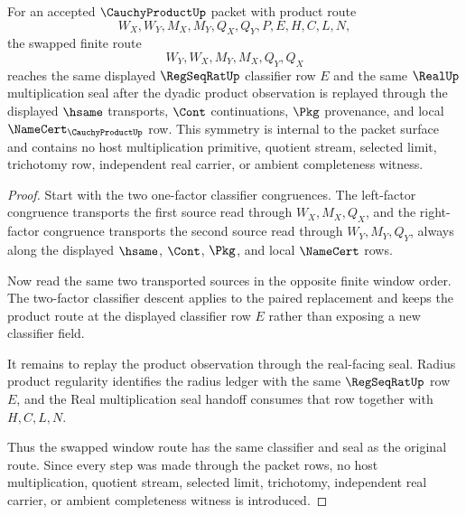 \begin{theorem}
\label{thm:cauchy-product-swapped-window-classifier-symmetry}
For an accepted $\CauchyProductUp$ packet with product route
$$
W_X,W_Y,M_X,M_Y,Q_X,Q_Y,P,E,H,C,L,N,
$$
the swapped finite route
$$
W_Y,W_X,M_Y,M_X,Q_Y,Q_X
$$
reaches the same displayed $\RegSeqRatUp$ classifier row $E$ and the same $\RealUp$ multiplication seal after the dyadic product observation is replayed through the displayed $\hsame$ transports, $\Cont$ continuations, $\Pkg$ provenance, and local $\NameCert_{\CauchyProductUp}$ row. This symmetry is internal to the packet surface and contains no host multiplication primitive, quotient stream, selected limit, trichotomy row, independent real carrier, or ambient completeness witness.
\end{theorem}
\begin{proof}
Start with the two one-factor classifier congruences. The left-factor congruence transports the first source read through $W_X,M_X,Q_X$, and the right-factor congruence transports the second source read through $W_Y,M_Y,Q_Y$, always along the displayed $\hsame$, $\Cont$, $\Pkg$, and local $\NameCert$ rows.

Now read the same two transported sources in the opposite finite window order. The two-factor classifier descent applies to the paired replacement and keeps the product route at the displayed classifier row $E$ rather than exposing a new classifier field.

It remains to replay the product observation through the real-facing seal. Radius product regularity identifies the radius ledger with the same $\RegSeqRatUp$ row $E$, and the Real multiplication seal handoff consumes that row together with $H,C,L,N$.

Thus the swapped window route has the same classifier and seal as the original route. Since every step was made through the packet rows, no host multiplication, quotient stream, selected limit, trichotomy, independent real carrier, or ambient completeness witness is introduced.
\end{proof}

